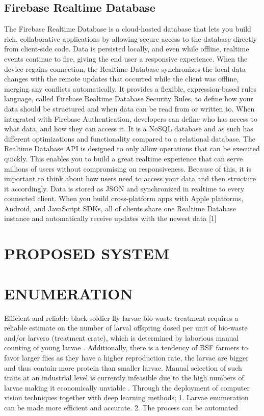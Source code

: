 \documentclass[conference]{IEEEtran}
\begin{document}
\subsection{Firebase Realtime Database}
The Firebase Realtime Database is a cloud-hosted database that lets you build rich, collaborative
applications by allowing secure access to the database directly from client-side code. Data is
persisted locally, and even while offline, realtime events continue to fire, giving the end user a
responsive experience. When the device regains connection, the Realtime Database synchronizes
the local data changes with the remote updates that occurred while the client was offline, merging
any conflicts automatically. It provides a flexible, expression-based rules language, called Firebase
Realtime Database Security Rules, to define how your data should be structured and when data
can be read from or written to. When integrated with Firebase Authentication, developers can
define who has access to what data, and how they can access it. It is a NoSQL database and as
such has different optimizations and functionality compared to a relational database. The Realtime
Database API is designed to only allow operations that can be executed quickly. This enables you
to build a great realtime experience that can serve millions of users without compromising on
responsiveness. Because of this, it is important to think about how users need to access your data
and then structure it accordingly. Data is stored as JSON and synchronized in realtime to every
connected client. When you build cross-platform apps with Apple platforms, Android, and
JavaScript SDKs, all of clients share one Realtime Database instance and automatically receive
updates with the newest data [1]
\section{PROPOSED SYSTEM}
\section{ENUMERATION}
Efficient and reliable black soldier fly larvae bio-waste treatment requires a reliable estimate
on the number of larval offspring dosed per unit of bio-waste and/or larvero (treatment crate),
which is determined by laborious manual counting of young larvae \cite{e1}. Additionally, there is
a tendency of BSF farmers to favor larger flies as they have a higher reproduction rate, the
larvae are bigger and thus contain more protein than smaller larvae. Manual selection of such
traits at an industrial level is currently infeasible due to the high numbers of larvae making it
economically unviable \cite{e2}.
Through the deployment of computer vision techniques together with deep learning methods;
1. Larvae enumeration can be made more efficient and accurate.
2. The process can be automated
\end{document}
